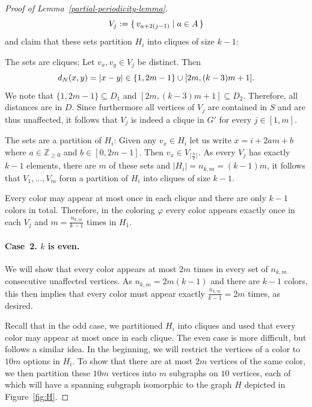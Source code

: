 \documentclass[a4paper,10pt,hidelinks]{amsart}
\newcommand{\Z}{\mathbb{Z}}
\newenvironment{claimproof}[1][\proofname]{\proof[#1]\renewcommand{\qedsymbol}{$\blacksquare$}}{\endproof}
\theoremstyle{definition}
\begin{document}
\begin{proof}[Proof of Lemma~\ref{partial-periodicity-lemma}]
\begin{claimproof}
        \begin{equation}\notag
            V_j := \{\, v_{a + 2(j - 1)} \mid a \in A \,\}    
        \end{equation}
        and claim that these sets partition $H_i$ into cliques of size $k-1$: 
        
        The sets are cliques: Let $v_x, v_y \in V_j$ be distinct. Then 
        \begin{equation}\notag
            d_N(x, y) = |x - y| \in \{1, 2m - 1\} \cup [2m, (k - 3)m + 1].
        \end{equation} 
        We note that $\{1, 2m - 1\} \subseteq D_1$ and $[2m, (k - 3)m + 1] \subseteq D_2$. Therefore, all distances are in $D$. Since furthermore all vertices of $V_j$ are contained in $S$ and are thus unaffected, it follows that $V_j$ is indeed a clique in $G'$ for every $j \in [1, m]$.

        The sets are a partition of $H_i$: Given any $v_x \in H_i$ let us write $x = i + 2am + b$ where $a \in \Z_{\ge 0}$ and $b \in [0, 2m - 1]$. Then $v_x \in V_{\lceil\frac{b}{2}\rceil}$. As every $V_j$ has exactly $k-1$ elements, there are $m$ of these sets and $|H_i|=n_{k,m}=(k-1)m$, it follows that $V_1, \dots, V_m$ form a partition of $H_i$ into cliques of size $k-1$. 

        Every color may appear at most once in each clique and there are only $k-1$ colors in total. Therefore, in the coloring $\varphi$ every color appears exactly once in each $V_j$ and $m = \frac{n_{k,m}}{k-1}$ times in $H_1$. 

        \medskip

        \paragraph*{\textbf{Case~2.} $k$ is even.}

        We will show that every color appears at most $2m$ times in every set of $n_{k, m}$ consecutive unaffected vertices. As $n_{k,m} = 2m(k - 1)$ and there are $k-1$ colors, this then implies that every color must appear exactly $\frac{n_{k,m}}{k-1}=2m$ times, as desired.

        Recall that in the odd case, we partitioned $H_i$ into cliques and used that every color may appear at most once in each clique. The even case is more difficult, but follows a similar idea. In the beginning, we will restrict the vertices of a color to $10m$ options in $H_i$. To show that there are at most $2m$ vertices of the same color, we then partition these $10m$ vertices into $m$ subgraphs on $10$ vertices, each of which will have a spanning subgraph isomorphic to the graph $H$ depicted in Figure~\ref{fig:H}.


\end{claimproof}
\end{proof}
\end{document}

